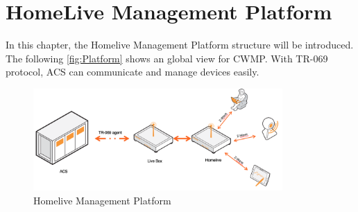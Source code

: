 
\chapter{HomeLive Management Platform} %

\label{Chapter4} %


In this chapter, the Homelive Management Platform structure will be introduced. The following \autoref{fig:Platform} shows an global view for CWMP. With TR-069 protocol, ACS can communicate and manage devices easily.
\begin{figure}[htbp]
	\centering
		\includegraphics[width=9.5cm]{Figures/Homelive_Management_Platform.png}
	\caption[Homelive Management Platform]{Homelive Management Platform}
	\label{fig:Platform}
\end{figure}

